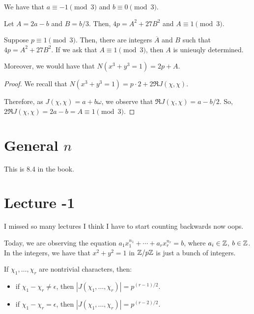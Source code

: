 \documentclass{article}
\begin{document}
\begin{proposition}
	We have that $a \equiv -1 \pmod 3$ and $b \equiv 0 \pmod 3$.
\end{proposition}

\begin{proposition}
	Let $A = 2a - b$ and $B = b / 3$. Then, $4p = A^2 + 27B^2$ and $A \equiv 1 \pmod 3$.
\end{proposition}

\begin{theorem}
	Suppose $p \equiv 1 \pmod 3$. Then, there are integers $\overline{A}$ and $B$ such that $4p = A^2 + 27B^2$. If we ask that $A \equiv 1 \pmod 3$, then $A$ is unieuqly determined.

Moreover, we would have that $N(x^3 + y^3 = 1) = 2p + A$.
\end{theorem}

\begin{proof}
	We recall that $N(x^3 + y^3 = 1) = p \cdot 2 + 2 \Re J(\chi, \chi)$.

	Therefore, as $J(\chi, \chi) = a + b\omega$, we observe that $\Re J(\chi, \chi) = a - b/2$. So, $2 \Re J(\chi, \chi) = 2a - b = A \equiv 1 \pmod 3$.
\end{proof}

\section{General $n$}
This is 8.4 in the book.

\section{Lecture -1}
I missed so many lectures I think I have to start counting backwards now oops.

Today, we are observing the equation $a_1 x_1^{n_1} + \cdots + a_r x_r^{n_r} = b$, where $a_i \in \mathbb Z$, $b \in \mathbb Z$. In the integers, we have that $x^2 + y^2 = 1$ in $\mathbb Z / p\mathbb Z$ is just a bunch of integers.

\begin{proposition}
	If $\chi_1, \ldots, \chi_r$ are nontrivial characters, then: 
	\begin{itemize}
		\item if $\chi_1 - \chi_r \neq \epsilon$, then $|J(\chi_1, \ldots, \chi_r)| = p^{(r-1)/2}$.
		\item if $\chi_1 - \chi_r = \epsilon$, then $|J(\chi_1, \ldots, \chi_r)| = p^{(r-2)/2}$.
	\end{itemize}
\end{proposition}
\end{document}
